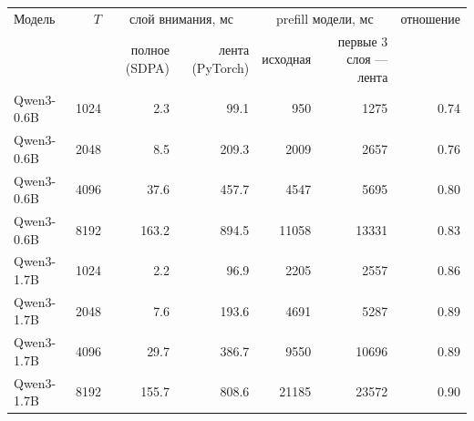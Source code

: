 \begin{tabular}{lrrrrrr}
\toprule
Модель & $T$ & \multicolumn{2}{c}{слой внимания, мс} & \multicolumn{2}{c}{prefill модели, мс} & отношение \\
 & & полное (SDPA) & лента (PyTorch) & исходная & первые 3 слоя --- лента & \\
\midrule
Qwen3-0.6B & 1024 & 2.3 & 99.1 & 950 & 1275 & 0.74 \\
Qwen3-0.6B & 2048 & 8.5 & 209.3 & 2009 & 2657 & 0.76 \\
Qwen3-0.6B & 4096 & 37.6 & 457.7 & 4547 & 5695 & 0.80 \\
Qwen3-0.6B & 8192 & 163.2 & 894.5 & 11058 & 13331 & 0.83 \\
Qwen3-1.7B & 1024 & 2.2 & 96.9 & 2205 & 2557 & 0.86 \\
Qwen3-1.7B & 2048 & 7.6 & 193.6 & 4691 & 5287 & 0.89 \\
Qwen3-1.7B & 4096 & 29.7 & 386.7 & 9550 & 10696 & 0.89 \\
Qwen3-1.7B & 8192 & 155.7 & 808.6 & 21185 & 23572 & 0.90 \\
\bottomrule
\end{tabular}

